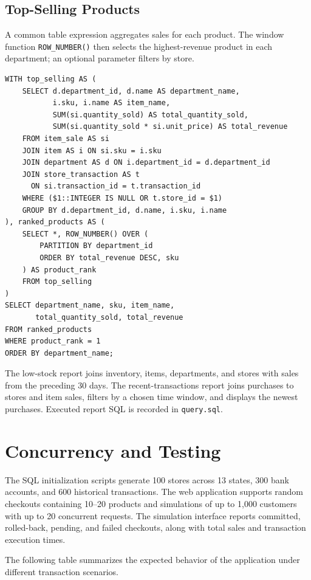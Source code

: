 \documentclass[11pt,letterpaper]{article}
\begin{document}
\subsection{Top-Selling Products}

A common table expression aggregates sales for each product. The window function \texttt{ROW\_NUMBER()} then selects the highest-revenue product in each department; an optional parameter filters by store.

\begin{lstlisting}
WITH top_selling AS (
    SELECT d.department_id, d.name AS department_name,
           i.sku, i.name AS item_name,
           SUM(si.quantity_sold) AS total_quantity_sold,
           SUM(si.quantity_sold * si.unit_price) AS total_revenue
    FROM item_sale AS si
    JOIN item AS i ON si.sku = i.sku
    JOIN department AS d ON i.department_id = d.department_id
    JOIN store_transaction AS t
      ON si.transaction_id = t.transaction_id
    WHERE ($1::INTEGER IS NULL OR t.store_id = $1)
    GROUP BY d.department_id, d.name, i.sku, i.name
), ranked_products AS (
    SELECT *, ROW_NUMBER() OVER (
        PARTITION BY department_id
        ORDER BY total_revenue DESC, sku
    ) AS product_rank
    FROM top_selling
)
SELECT department_name, sku, item_name,
       total_quantity_sold, total_revenue
FROM ranked_products
WHERE product_rank = 1
ORDER BY department_name;
\end{lstlisting}

The low-stock report joins inventory, items, departments, and stores with sales from the preceding 30 days. The recent-transactions report joins purchases to stores and item sales, filters by a chosen time window, and displays the newest purchases. Executed report SQL is recorded in \texttt{query.sql}.

\section{Concurrency and Testing}


The SQL initialization scripts generate 100 stores across 13 states, 300 bank accounts, and 600 historical transactions. The web application supports random checkouts containing 10--20 products and simulations of up to 1,000 customers with up to 20 concurrent requests. The simulation interface reports committed, rolled-back, pending, and failed checkouts, along with total sales and transaction execution times.



The following table summarizes the expected behavior of the application under different transaction scenarios.
\end{document}
